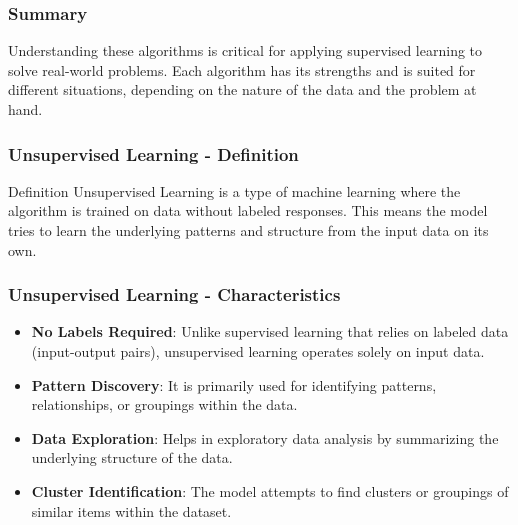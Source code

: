 \documentclass{beamer}
\begin{document}
\begin{frame}[fragile]
    \frametitle{Summary}
    Understanding these algorithms is critical for applying supervised learning to solve real-world problems. Each algorithm has its strengths and is suited for different situations, depending on the nature of the data and the problem at hand.
\end{frame}

\begin{frame}[fragile]
    \frametitle{Unsupervised Learning - Definition}
    \begin{block}{Definition}
        Unsupervised Learning is a type of machine learning where the algorithm is trained on data without labeled responses. This means the model tries to learn the underlying patterns and structure from the input data on its own.
    \end{block}
\end{frame}

\begin{frame}[fragile]
    \frametitle{Unsupervised Learning - Characteristics}
    \begin{itemize}
        \item \textbf{No Labels Required}: Unlike supervised learning that relies on labeled data (input-output pairs), unsupervised learning operates solely on input data.
        \item \textbf{Pattern Discovery}: It is primarily used for identifying patterns, relationships, or groupings within the data.
        \item \textbf{Data Exploration}: Helps in exploratory data analysis by summarizing the underlying structure of the data.
        \item \textbf{Cluster Identification}: The model attempts to find clusters or groupings of similar items within the dataset.
    \end{itemize}
\end{frame}
\end{document}
